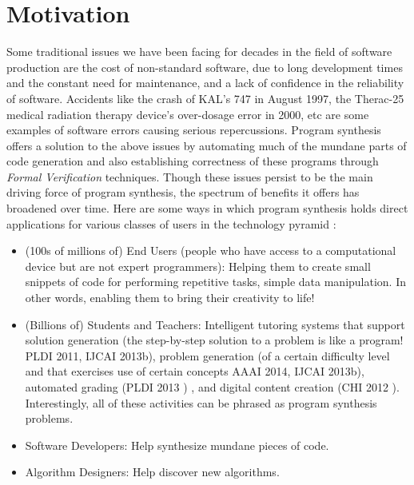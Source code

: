 \section{Motivation}
Some traditional issues \cite{kreitz1998program} we have been facing for decades in the field of software production are the cost of non-standard software, due to long development times and the constant need for maintenance, and a lack of confidence in the reliability of software. Accidents like the crash of KAL's 747 in August 1997, the Therac-25 medical radiation therapy device's over-dosage error in 2000, etc are some examples of software errors causing serious repercussions. Program synthesis offers a solution to the above issues by automating much of the mundane parts of code generation and also establishing correctness of these programs through \emph{Formal Verification} techniques. Though these issues persist to be the main driving force of program synthesis, the spectrum of benefits it offers has broadened over time. Here are some ways in which program synthesis holds direct applications for various classes of users in the technology pyramid :
\begin{itemize}
\item (100s of millions of) End Users (people who have access to a computational device but are not expert programmers): Helping them to create small snippets of code for performing repetitive tasks, simple data manipulation. In other words, enabling them to bring their creativity to life!
\item (Billions of) Students and Teachers: Intelligent tutoring systems that support solution generation (the step-by-step solution to a problem is like a program! PLDI 2011\cite{gulwani2011synthesizing}, IJCAI 2013b\cite{ahmed2013automatically}), problem generation (of a certain difficulty level and that exercises use of certain concepts AAAI 2014\cite{alvin2014synthesis}, IJCAI 2013b\cite{ahmed2013automatically}), automated grading (PLDI 2013 \cite{singh2013automated}) , and digital content creation (CHI 2012 \cite{cheema2012quickdraw}). Interestingly, all of these activities can be phrased as program synthesis problems.
\item Software Developers: Help synthesize mundane pieces of code.
\item Algorithm Designers: Help discover new algorithms.
\end{itemize}

